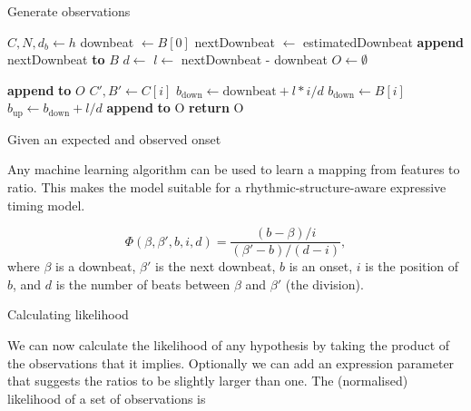 \begin{algorithm}
\caption{Generate observations}
\label{alg:observations}
\begin{algorithmic}
	\State $C, N, d_b \leftarrow h$
		\State downbeat $\leftarrow B[0]$
	\EndIf
		\State nextDownbeat $\leftarrow$ estimatedDownbeat
	\EndIf
	\State \textbf{append} nextDownbeat \textbf{to} $B$
	\State $d \leftarrow$ 
	\State $l \leftarrow$ nextDownbeat - downbeat
	\State $O \leftarrow \emptyset$

			\State \textbf{append}  \textbf{to} $O$
		\EndIf	
		\State $C', B' \leftarrow C[i]$
			\State $b_{\mathrm{down}} \leftarrow \mathrm{downbeat} + l * i/d$
				\State $b_{\mathrm{down}} \leftarrow B[i]$
			\EndIf
			\State $b_{\mathrm{up}} \leftarrow b_{\mathrm{down}} + l/d$
			\State \textbf{append}  \textbf{to} O
		\EndIf
	\EndFor
	\State \textbf{return} O
\EndFunction
\end{algorithmic}
\end{algorithm}

Given an expected and observed onset

Any machine learning algorithm can be used to learn a mapping from features to ratio. This makes the model suitable for a rhythmic-structure-aware expressive timing model.


\begin{equation}
\Phi(\beta, \beta', b, i, d) = \frac{(b - \beta) / i}{(\beta' - b) / (d - i)},
\end{equation}
where $\beta$ is a downbeat, $\beta'$ is the next downbeat, $b$ is an onset, $i$ is the position of $b$, and $d$ is the number of beats between $\beta$ and $\beta'$ (the division).

Calculating likelihood

We can now calculate the likelihood of any hypothesis by taking the product of the observations that it implies. Optionally we can add an expression parameter that suggests the ratios to be slightly larger than one. The (normalised) likelihood of a set of observations is

